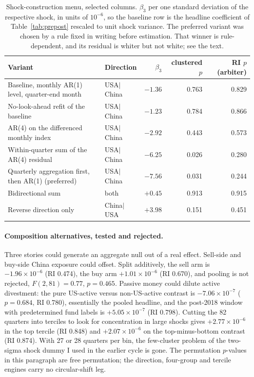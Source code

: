 \documentclass[11pt]{article}
\begin{document}
\begin{table}[H]
\centering
\small
\caption{Shock-construction menu, selected columns. $\beta_3$ per one standard
deviation of the respective shock, in units of $10^{-6}$, so the baseline row
is the headline coefficient of Table~\ref{tab:prepost} rescaled to unit shock
variance. The preferred variant was chosen by a rule fixed in writing before
estimation. That winner is rule-dependent, and its residual is whiter but not
white; see the text.}
\label{tab:shockmenu}
\begin{tabular}{llrrr}
\toprule
Variant & Direction & $\beta_3$ & clustered $p$ & RI $p$ (arbiter) \\
\midrule
Baseline, monthly AR(1) level, quarter-end month & USA$|$China & $-1.36$ & 0.763 & 0.829 \\
No-look-ahead refit of the baseline              & USA$|$China & $-1.23$ & 0.784 & 0.866 \\
AR(4) on the differenced monthly index           & USA$|$China & $-2.92$ & 0.443 & 0.573 \\
Within-quarter sum of the AR(4) residual         & USA$|$China & $-6.25$ & 0.026 & 0.280 \\
Quarterly aggregation first, then AR(1) (preferred) & USA$|$China & $-7.56$ & 0.031 & 0.244 \\
Bidirectional sum                                & both        & $+0.45$ & 0.913 & 0.915 \\
Reverse direction only                           & China$|$USA & $+3.98$ & 0.151 & 0.451 \\
\bottomrule
\end{tabular}
\end{table}

\paragraph{Composition alternatives, tested and rejected.} Three stories could
generate an aggregate null out of a real effect. Sell-side and buy-side China
exposure could offset. Split additively, the sell arm is
$-1.96 \times 10^{-6}$ (RI 0.474), the buy arm $+1.01 \times 10^{-6}$
(RI 0.670), and pooling is not rejected, $F(2,81) = 0.77$, $p = 0.465$. Passive
money could dilute active divestment: the pure US-active versus non-US-active
contrast is $-7.06 \times 10^{-7}$ ($p = 0.684$, RI 0.780), essentially the
pooled headline, and the post-2018 window with predetermined fund labels is
$+5.05 \times 10^{-7}$ (RI 0.798). Cutting the 82 quarters into terciles to
look for concentration in large shocks gives $+2.77 \times 10^{-6}$ in the top
tercile (RI 0.848) and $+2.07 \times 10^{-6}$ on the top-minus-bottom contrast
(RI 0.874). With 27 or 28 quarters per bin, the few-cluster problem of the
two-sigma shock dummy I used in the earlier cycle is gone. The permutation
$p$-values in this paragraph are free permutation; the direction, four-group
and tercile engines carry no circular-shift leg.
\end{document}
